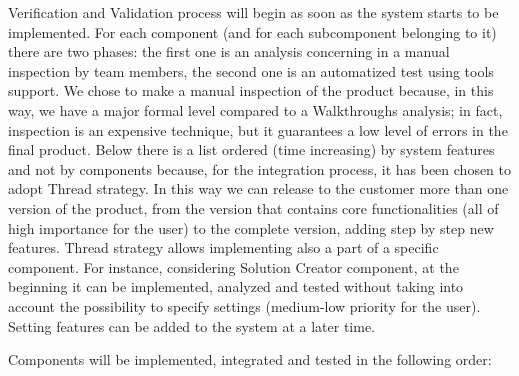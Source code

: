 \bigskip
\noindent
Verification and Validation process will begin as soon as the system starts to be implemented. For each component (and for each subcomponent belonging to it) there are two phases: the first one is an analysis concerning in a manual inspection by team members, the second one is an automatized test using tools support. We chose to make a manual inspection of the product because, in this way, we have a major formal level compared to a Walkthroughs analysis; in fact, inspection is an expensive technique, but it guarantees a low level of errors in the final product.\newline
Below there is a list ordered (time increasing) by system features and not by components because, for the integration process, it has been chosen to adopt Thread strategy. In this way we can release to the customer more than one version of the product, from the version that contains core functionalities (all of high importance for the user) to the complete version, adding step by step new features.
Thread strategy allows implementing also a part of a specific component. For instance, considering Solution Creator component, at the beginning it can be implemented, analyzed and tested without taking into account the possibility to specify settings (medium-low priority for the user). Setting features can be added to the system at a later time.\bigskip \newline 

\noindent
Components will be implemented, integrated and tested in the following order:

